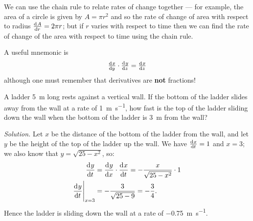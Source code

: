 


We can use the chain rule to relate rates of change together --- for example, the area of a circle is given by $ A = \pi r^2 $
and so the rate of change of area with respect to radius $ \od{A}{r} = 2\pi r $; but if $ r $ varies with respect to time then
we can find the rate of change of the area with respect to time using the chain rule.

A useful mnemonic is
\begin{displaymath}
  \od{x}{y} \cdot \od{y}{z} = \od{x}{z}
\end{displaymath}
although one must remember that derivatives are \textbf{not} fractions!

\begin{ex}
  A ladder \SI{5}{\metre} long rests against a vertical wall. If the bottom of the ladder slides away
  from the wall at a rate of \SI{1}{\metre\per\second}, how fast is the top of the ladder sliding down the
  wall when the bottom of the ladder is \SI{3}{\metre} from the wall?

  \textit{Solution.} Let $ x $ be the distance of the bottom of the ladder from the wall, and let $ y $
  be the height of the top of the ladder up the wall. We have $ \od{x}{t} = 1 $ and $ x = 3 $; we also
  know that $ y = \sqrt{25 - x^2} $, so:
  \begin{align*}
    \dod{y}{t} &= \dod{y}{x} \cdot \dod{x}{t} = -\frac{x}{\sqrt{25 - x^2}} \cdot 1\\
    \eval{\dod{y}{t}}_{x = 3} &= -\frac{3}{\sqrt{25 - 9}} = -\frac{3}{4}.
  \end{align*}
  Hence the ladder is sliding down the wall at a rate of \SI{-0.75}{\metre\per\second}.
\end{ex}

